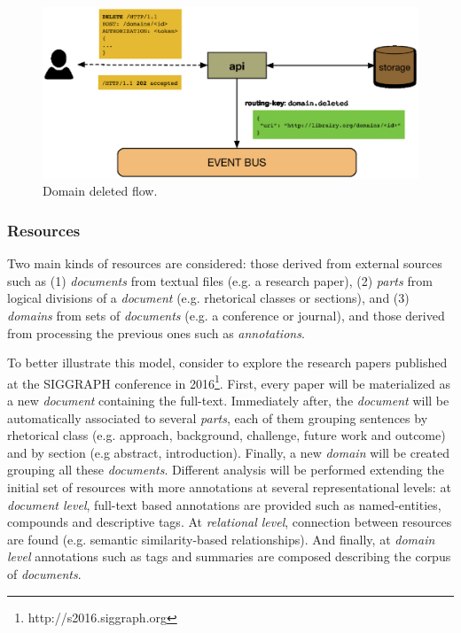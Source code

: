 \begin{figure}
  \includegraphics[scale=0.35]{api-domain-deleted}
  \caption{Domain deleted flow.}
  \label{fig:librairy-domain-deleted}
\end{figure}

\subsubsection{Resources}

Two main kinds of resources are considered: those derived from external sources such as (1) \textit{documents} from textual files (e.g. a research paper), (2) \textit{parts} from logical divisions of a \textit{document} (e.g. rhetorical classes or sections), and (3) \textit{domains} from sets of \textit{documents} (e.g. a conference or journal), and those derived from processing the previous ones such as \textit{annotations}. 

To better illustrate this model, consider to explore the research papers published at the SIGGRAPH conference in 2016\footnote{http://s2016.siggraph.org}. First, every paper will be materialized as a new \textit{document} containing the full-text. Immediately after, the \textit{document} will be automatically associated to several \textit{parts}, each of them grouping sentences by rhetorical class (e.g. approach, background, challenge, future work and outcome) and by section (e.g abstract, introduction). Finally, a new \textit{domain} will be created grouping all these \textit{documents}. Different analysis will be performed extending the initial set of resources with more annotations at several representational levels: at \textit{document level}, full-text based annotations are provided such as named-entities, compounds and descriptive tags. At \textit{relational level}, connection between resources are found (e.g. semantic similarity-based relationships). And finally, at \textit{domain level} annotations such as tags and summaries are composed describing the corpus of \textit{documents}.

